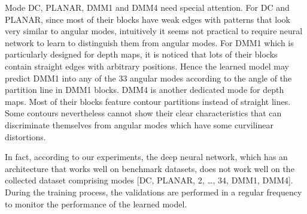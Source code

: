Mode DC, PLANAR, DMM1 and DMM4 need special attention.
For DC and PLANAR, since most of their blocks
have weak edges with patterns that look
very similar to angular modes,
intuitively it seems not practical to require 
neural network to learn to 
distinguish them from angular modes.
For DMM1 which is particularly designed for depth maps,
it is noticed that lots of their
blocks contain straight edges with arbitrary positions.
Hence the learned model may predict DMM1 into any
of the 33 angular modes according to the angle of
the partition line in DMM1 blocks.
DMM4 is another dedicated mode for depth maps.
Most of their blocks feature contour partitions instead of
straight lines.
Some contours nevertheless cannot show 
their clear characteristics that can 
discriminate themselves
from angular modes which have some curvilinear distortions.

In fact, according to our experiments,
the deep neural network, which has 
an architecture that works well on 
benchmark datasets, does not work well on 
the collected dataset comprising modes
[DC, PLANAR, 2, \ldots, 34, DMM1, DMM4].
During the training process, the validations
are performed in a regular frequency to monitor 
the performance of the learned model.

